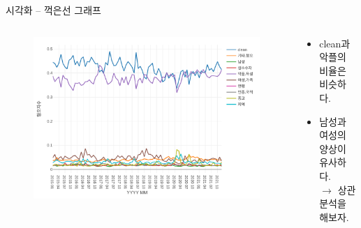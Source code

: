 \documentclass[mathserif, aspectratio=169]{beamer}
\begin{document}
\begin{frame}{시각화 -- 꺽은선 그래프}
    \begin{columns}
        \begin{column}{0.5\linewidth}
            \centering
            \begin{figure}
                \includegraphics[width = \linewidth]{images/lineplot.pdf}
            \end{figure}
        \end{column}
        \begin{column}{0.5\linewidth}
            \begin{itemize}
                \item clean과 악플의 비율은 비슷하다.
                \item 남성과 여성의 양상이 유사하다.\\$\rightarrow$ 상관분석을 해보자.
            \end{itemize}
        \end{column}
    \end{columns}
\end{frame}
\end{document}
